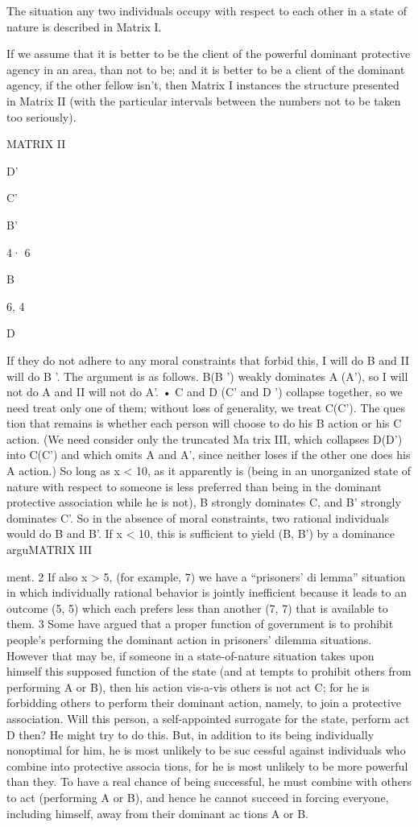 \documentclass[11pt,openany]{book}
\begin{document}
The situation any two individuals occupy with respect to each other in a state of nature is described in Matrix I. 

If we assume that it is better to be the client of the powerful dominant protective agency in an area, than not to be; and it is better to be a client of the dominant agency, if the other fellow isn't, then Matrix I instances the structure presented in Matrix II (with the particular intervals between the numbers not to be taken too seriously). 

MATRIX II 

D' 

C' 

B' 

4· 6 

B 

6, 4 

D 

If they do not adhere to any moral constraints that forbid this, I will do B and II will do B '. The argument is as follows. B(B ') weakly dominates A (A'), so I will not do A and II will not do A'. • C and D (C' and D ') collapse together, so we need treat only one of them; without loss of generality, we treat C(C'). The ques tion that remains is whether each person will choose to do his B action or his C action. (We need consider only the truncated Ma trix III, which collapses D(D') into C(C') and which omits A and A', since neither loses if the other one does his A action.) So long as x < 10, as it apparently is (being in an unorganized state of nature with respect to someone is less preferred than being in the dominant protective association while he is not), B strongly dominates C, and B' strongly dominates C'. So in the absence of moral constraints, two rational individuals would do B and B'. If x < 10, this is sufficient to yield (B, B') by a dominance arguMATRIX III 

ment. 2 If also x > 5, (for example, 7) we have a ``prisoners' di lemma'' situation in which individually rational behavior is jointly inefficient because it leads to an outcome (5, 5) which each prefers less than another (7, 7) that is available to them. 3 Some have argued that a proper function of government is to prohibit people's performing the dominant action in prisoners' dilemma situations. However that may be, if someone in a state-of-nature situation takes upon himself this supposed function of the state (and at tempts to prohibit others from performing A or B), then his action vis-a-vis others is not act C; for he is forbidding others to perform their dominant action, namely, to join a protective association. Will this person, a self-appointed surrogate for the state, perform act D then? He might try to do this. But, in addition to its being individually nonoptimal for him, he is most unlikely to be suc cessful against individuals who combine into protective associa tions, for he is most unlikely to be more powerful than they. To have a real chance of being successful, he must combine with others to act (performing A or B), and hence he cannot succeed in forcing everyone, including himself, away from their dominant ac tions A or B. 
\end{document}
